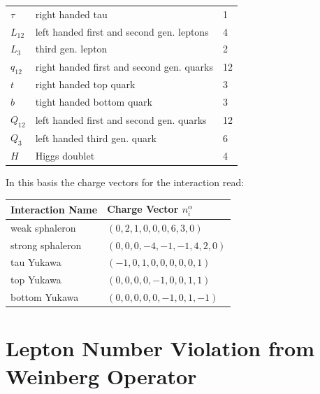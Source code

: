 \documentclass[master,       %
               twoside,        %
               BCOR10mm,       %
               english,ngerman, %
               ]{GAUBM}
\begin{document}
\begin{otherlanguage}{english}
\begin{table}[H]
\begin{center}
\begin{tabular}{lll}
			\hline
			$\tau$ & right handed tau &1  \\
			$L_{12}$ & left handed first and second gen. leptons & 4 \\
			$L_3$ & third gen. lepton& 2 \\
			$q_{12}$ & right handed first and second gen. quarks & 12 \\
			$t$ & right handed top quark & 3 \\
			$b$ & tight handed bottom quark & 3 \\
			$Q_{12}$ & left handed first and second gen. quarks & 12 \\
			$Q_3$ & left handed third gen. quark  & 6 \\
			$H$ & Higgs doublet & 4 \\
		\end{tabular}
	\end{center}
\end{table}
In this basis the charge vectors for the interaction read:
\begin{table}[H]
	\begin{center}
		\begin{tabular}{ll}
			Interaction Name & Charge Vector $n^\alpha_i$ \\
			\hline
			weak sphaleron & $(0,2,1,0,0,0,6,3,0)$ \\
			strong sphaleron & $(0,0,0,-4,-1,-1,4,2,0)$ \\
			tau Yukawa & $(-1,0,1,0,0,0,0,0,1)$ \\
			top Yukawa & $(0,0,0,0,-1,0,0,1,1)$ \\
			bottom Yukawa & $(0,0,0,0,0,-1,0,1,-1)$ \\
		\end{tabular}
	\end{center}
\end{table}


\section{Lepton Number Violation from Weinberg Operator}
\label{sec:lepton_number_violation_from_weinberg_operator}


\end{otherlanguage}
\end{document}
